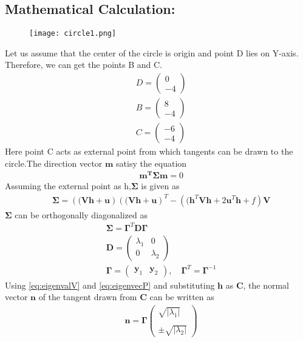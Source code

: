 \documentclass[a4paper,12pt,twocolumn]{article}
\providecommand{\abs}[1]{\left\vert#1\right\vert}
\let\vec\mathbf
\newcommand{\myvec}[1]{\ensuremath{\begin{pmatrix}#1\end{pmatrix}}}
\providecommand{\brak}[1]{\ensuremath{\left((#1\right)}}
\begin{document}
\subsection{Mathematical Calculation:}
\begin{figure}[h]
    \texttt{[image: circle1.png]}
\end{figure}
Let us assume that the center of the circle is origin and point D lies on Y-axis.\\
Therefore, we can get the points B and C.\\
\begin{align*}
	&D = \myvec{0\\-4}\\
	&B = \myvec{8\\-4}\\
	&C = \myvec{-6\\-4}
\end{align*}
Here point C acts as external point from which tangents can be drawn to the circle.The direction vector $\vec{m}$ satisy the equation\\
\begin{align*}
	&\vec{m^T}\vec{\Sigma}\vec{m} = 0
\end{align*}
Assuming the external point as h,$\vec{\Sigma}$ is given as\\
\begin{align*}
	&\vec{\Sigma} = \brak{\vec{Vh}+\vec{u}}\brak{\vec{Vh}+\vec{u}}^T - \brak{\vec{h}^T\vec{V}\vec{h} + 2\vec{u}^T\vec{h} + f}\vec{V}
\end{align*}
$\vec{\Sigma}$ can be orthogonally  diagonalized as\\
\begin{align}
	&\vec{\Sigma} = \vec{\Gamma}^T\vec{D}\vec{\Gamma}\\
	\label{eq:eigenvalV}
	&\vec{D} = \myvec{\lambda_1 & 0\\0 & \lambda_2}\\
	\label{eq:eigenvecP}
	&\vec{\Gamma} = \myvec{\vec{y}_1 & \vec{y}_2}, \quad \vec{\Gamma}^T=\vec{\Gamma}^{-1}
\end{align}
Using \eqref{eq:eigenvalV} and \eqref{eq:eigenvecP} and substituting $\vec{h}$ as $\vec{C}$, the normal vector $\vec{n}$ of the tangent drawn from $\vec{C}$ can be written as\\
\begin{align}
	\label{eq:tangent_normal}
	&\vec{n} = \vec{\Gamma}\myvec{\sqrt{\abs{\lambda_1}} \\\\ \pm\sqrt{\abs{\lambda_2}}}
\end{align}
\end{document}
